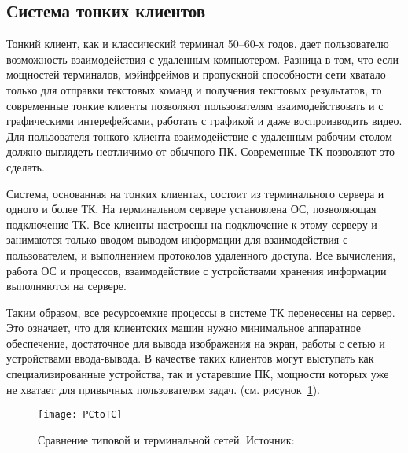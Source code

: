 \subsection{Система тонких клиентов}
Тонкий клиент, как и классический терминал 50–60-х годов, дает пользователю возможность
взаимодействия с удаленным компьютером. Разница в том, что если мощностей терминалов,
мэйнфреймов и пропускной способности сети хватало только для отправки текстовых команд и
получения текстовых результатов, то современные тонкие клиенты позволяют пользователям
взаимодействовать и с графическими интерефейсами, работать с графикой и даже
воспроизводить видео. Для пользователя тонкого клиента взаимодействие с удаленным
рабочим столом должно выглядеть неотличимо от обычного ПК. Современные ТК позволяют это
сделать.

Система, основанная на тонких клиентах, состоит из терминального сервера и одного и
более ТК. На терминальном сервере установлена ОС, позволяющая подключение ТК. Все
клиенты настроены на подключение к этому серверу и занимаются только вводом-выводом
информации для взаимодействия с пользователем, и выполнением протоколов удаленного
доступа. Все вычисления, работа ОС и процессов, взаимодействие с устройствами хранения
информации выполняются на сервере. 

Таким образом, все ресурсоемкие процессы в системе ТК перенесены на сервер. Это
означает, что для клиентских машин нужно минимальное аппаратное обеспечение, достаточное
для вывода изображения на экран, работы с сетью и устройствами ввода-вывода. В качестве
таких клиентов могут выступать как специализированные устройства, так и устаревшие ПК,
мощности которых уже не хватает для привычных пользователям задач.
(см. рисунок~\ref{pic:PCtoTC}).

\begin{figure}[htpb]
    \center
    \texttt{[image: PCtoTC]}
    \caption{Сравнение типовой и терминальной сетей. Источник: \cite{PCtoTCsrc}}
    \label{pic:PCtoTC}
\end{figure}

